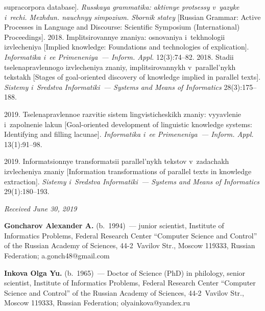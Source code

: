 \begin{multicols}{2}
{{\begin{thebibliography}{99}
supracorpora database]. \textit{Russkaya grammatika: aktivnye protsessy v~yazyke 
i~rechi. Mezhdun. nauchnyy simpozium. Sbornik statey} [Russian Grammar: 
Active Processes in Language and Discourse: Scientific Symposium (International) 
Proceedings].
 2018. Implitsirovannye znaniya: osnovaniya i~tekhnologii 
izvlecheniya [Implied knowledge: Foundations and technologies of explication]. 
\textit{Informatika i~ee Primeneniya~--- Inform. Appl.} 12(3):74--82.
 2018. Stadii tselenapravlennogo iz\-vle\-che\-niya znaniy, 
implitsirovannykh v~parallel'nykh teks\-takh [Stages of goal-oriented discovery of 
knowledge implied in parallel texts]. \textit{Sistemy i~Sredstva Informatiki~---
Systems and Means of Informatics} 28(3):175--188.

 2019. Tselenapravlennoe razvitie sistem lingvisticheskikh 
znaniy: vyyavlenie i~zapolnenie lakun [Goal-oriented development of linguistic 
knowledge systems: Identifying and filling lacunae]. \textit{Informatika i~ee 
Primeneniya~--- Inform. Appl.} 13(1):91--98.

 2019. In\-for\-ma\-tsi\-on\-nye 
transformatsii parallel'nykh tekstov v~zadachakh izvlecheniya znaniy [Information 
transformations of parallel texts in knowledge extraction]. \textit{Sistemy 
i~Sredstva Informatiki~--- Systems and Means of Informatics} 29(1):180--193.

\end{thebibliography}

 }
 }

\end{multicols}


\hfill{\small\textit{Received June 30, 2019}}




  \Contr
  
  \noindent
  \textbf{Goncharov Alexander A.} (b.\ 1994)~--- junior scientist, Institute of 
Informatics Problems, Federal Research Center ``Computer Science and Control'' 
of the Russian Academy of Sciences, 44-2~Vavilov Str., Moscow 119333, Russian 
Federation; \mbox{a.gonch48@gmail.com}
  
  \vspace*{3pt}
  
  \noindent
  \textbf{Inkova Olga Yu.} (b.\ 1965)~--- Doctor of Science (PhD) in philology, 
senior scientist, Institute of Informatics Problems, Federal Research Center 
``Computer Science and Control'' of the Russian Academy of Sciences,  
44-2~Vavilov Str., Moscow 119333, Russian Federation; 
\mbox{olyainkova@yandex.ru}

\label{end\stat}

\renewcommand{\bibname}{\protect\rm Литература}  